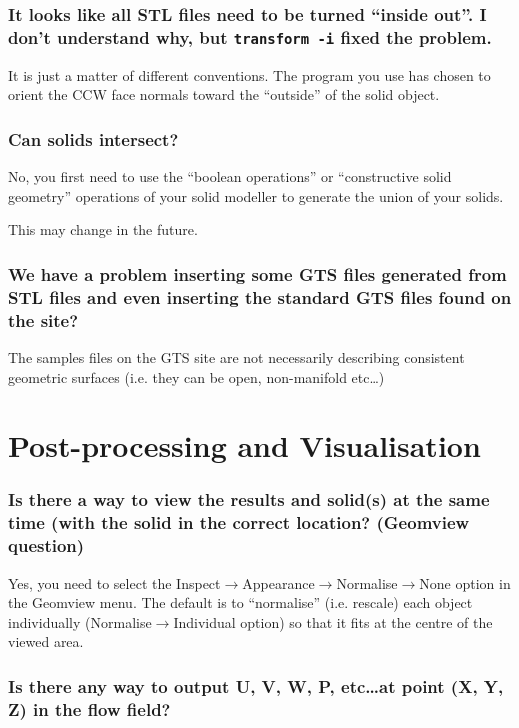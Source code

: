 \documentclass[a4paper]{article}
\begin{document}
\subsubsection{It looks like all STL files need to be turned ``inside out''.  I don't understand why, but {\tt transform -i} fixed the problem.}

It is just a matter of different conventions. The program you use has
chosen to orient the CCW face normals toward the ``outside'' of the
solid object.

\subsubsection{Can solids intersect?}

No, you first need to use the ``boolean operations'' or ``constructive
solid geometry'' operations of your solid modeller to generate the
union of your solids.

This may change in the future.

\subsubsection{We have a problem inserting some GTS files generated 
from STL files and even inserting the standard GTS files found 
on the  site?}

The samples files on the GTS site are not
necessarily describing consistent geometric surfaces (i.e. they can be
open, non-manifold etc\dots)

\section{Post-processing and Visualisation}

\subsubsection{Is there a way to view the results and solid(s) at the same time (with the 
solid in the correct location? (Geomview question)}

Yes, you need to select the Inspect$\rightarrow$Appearance$\rightarrow$Normalise$\rightarrow$None
option in the Geomview menu. The default is to ``normalise''
(i.e. rescale) each object individually (Normalise$\rightarrow$Individual option)
so that it fits at the centre of the viewed area.

\subsubsection{Is there any way to output U, V, W, P, etc\dots at point (X, Y, Z) in the flow field?}
\end{document}
